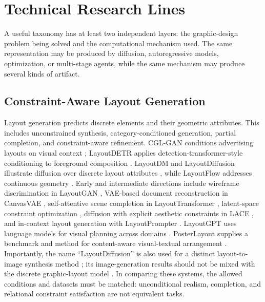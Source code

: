 \section{Technical Research Lines}
\label{sec:methods}
A useful taxonomy has at least two independent layers: the graphic-design problem being solved and the computational mechanism used. The same representation may be produced by diffusion, autoregressive models, optimization, or multi-stage agents, while the same mechanism may produce several kinds of artifact.

\subsection{Constraint-Aware Layout Generation}
Layout generation predicts discrete elements and their geometric attributes. This includes unconstrained synthesis, category-conditioned generation, partial completion, and constraint-aware refinement. CGL-GAN conditions advertising layouts on visual context \citep{cglgan2022}; LayoutDETR applies detection-transformer-style conditioning to foreground composition \citep{layoutdetr2024}. LayoutDM and LayoutDiffusion illustrate diffusion over discrete layout attributes \citep{layoutdm2023,layoutdiffusion2023}, while LayoutFlow addresses continuous geometry \citep{layoutflow2024}. Early and intermediate directions include wireframe discrimination in LayoutGAN \citep{layoutgan2019}, VAE-based document reconstruction in CanvasVAE \citep{canvasvae2021}, self-attentive scene completion in LayoutTransformer \citep{layouttransformer2021}, latent-space constraint optimization \citep{constraintlayout2021}, diffusion with explicit aesthetic constraints in LACE \citep{lace2024}, and in-context layout generation with LayoutPrompter \citep{layoutprompter2023}. LayoutGPT uses language models for visual planning across domains \citep{layoutgpt2023}. PosterLayout supplies a benchmark and method for content-aware visual-textual arrangement \citep{posterlayout2023}. Importantly, the name ``LayoutDiffusion'' is also used for a distinct layout-to-image synthesis method \citep{layoutdiffusion_l2i2023}; its image-generation results should not be mixed with the discrete graphic-layout model \citep{layoutdiffusion2023}. In comparing these systems, the allowed conditions and datasets must be matched: unconditional realism, completion, and relational constraint satisfaction are not equivalent tasks.

